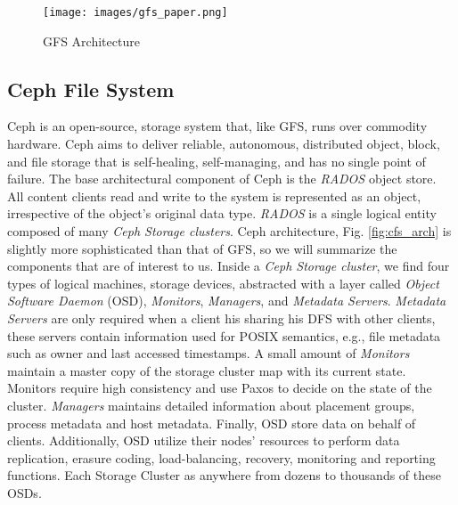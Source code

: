 \documentclass[runningheads]{llncs}
\begin{document}
\begin{figure}[!ht]
\centering
\texttt{[image: images/gfs\_paper.png]}
\caption{GFS Architecture \cite{gfs}}
\label{fig:gfs_arch}
\end{figure}

\newpage\subsection{Ceph File System}
Ceph \cite{ceph} is an open-source, storage system that, like GFS, runs over commodity hardware. Ceph aims to deliver reliable, autonomous, distributed object, block, and file storage that is self-healing, self-managing, and has no single point of failure. The base architectural component of Ceph is the \textit{RADOS} object store. All content clients read and write to the system is represented as an object, irrespective of the object's original data type. \textit{RADOS} is a single logical entity composed of many \textit{Ceph Storage clusters}. Ceph architecture, Fig. \ref{fig:cfs_arch} is slightly more sophisticated than that of GFS, so we will summarize the components that are of interest to us. Inside a \textit{Ceph Storage cluster}, we find four types of logical machines, storage devices, abstracted with a layer called \textit{Object Software Daemon} (OSD), \textit{Monitors}, \textit{Managers}, and \textit{Metadata Servers}. \textit{Metadata Servers} are only required when a client his sharing his DFS with other clients, these servers contain information used for POSIX semantics, e.g., file metadata such as owner and last accessed timestamps. A small amount of \textit{Monitors} maintain a master copy of the storage cluster map with its current state. Monitors require high consistency and use Paxos \cite{paxos} to decide on the state of the cluster. \textit{Managers} maintains detailed information about placement groups, process metadata and host metadata. Finally, OSD store data on behalf of clients. Additionally, OSD utilize their nodes' resources to perform data replication, erasure coding, load-balancing, recovery, monitoring and reporting functions. Each Storage Cluster as anywhere from dozens to thousands of these OSDs.
\end{document}
